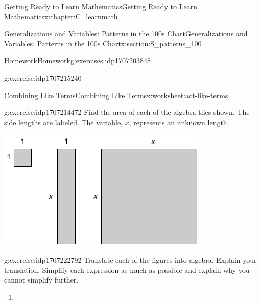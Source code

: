 \documentclass[oneside,10pt,]{book}
\numberwithin{equation}{chapter}
\begin{document}
\begin{chapterptx}{Getting Ready to Learn Mathematics}{}{Getting Ready to Learn Mathematics}{}{}{x:chapter:C_learnmath}
\begin{sectionptx}{Generalizations and Variables: Patterns in the 100s Chart}{}{Generalizations and Variables: Patterns in the 100s Chart}{}{}{x:section:S_patterns_100}
\begin{exercises-subsection}{Homework}{}{Homework}{}{}{g:exercises:idp1707203848}
\begin{divisionexercise}{4}{}{}{g:exercise:idp1707215240}
\end{divisionexercise}%
%
\end{exercises-subsection}
%
%
\typeout{************************************************}
\typeout{************************************************}
%
\begin{worksheet-subsection}{Combining Like Terms}{}{Combining Like Terms}{}{}{x:worksheet:act-like-terms}
\begin{divisionexercise}{1}{}{}{g:exercise:idp1707214472}%
Find the area of each of the algebra tiles shown. The side lengths are labeled. The variable, \(x\), represents an unknown length.%
\begin{image}{0.25}{0.5}{0.25}%
\includegraphics[width=\linewidth]{external/tiles-like-terms1.pdf}
\end{image}%
\end{divisionexercise}%
\begin{divisionexercise}{2}{}{}{g:exercise:idp1707222792}%
Translate each of the figures into algebra. Explain your translation. Simplify each expression as much as possible and explain why you cannot simplify further.%
\begin{enumerate}[font=\bfseries,label=(\alph*),ref=\alph*]
\item{}\begin{image}{0.35}{0.3}{0.35}%

\end{image}
\end{enumerate}
\end{divisionexercise}
\end{worksheet-subsection}
\end{sectionptx}
\end{chapterptx}
\end{document}
